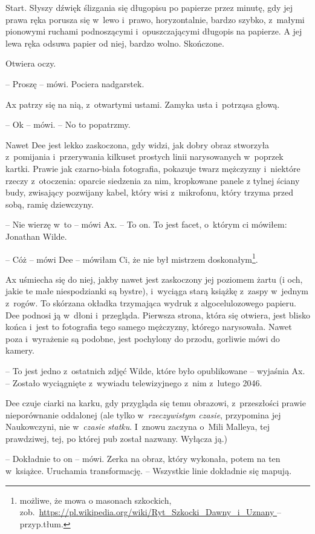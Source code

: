 \documentclass[oneside,polish,11pt,sfheadings]{mwbk}
\begin{document}
Start. Słyszy dźwięk ślizgania się długopisu po papierze przez minutę,
gdy jej prawa ręka porusza się w~lewo i~prawo, horyzontalnie, bardzo
szybko, z~małymi pionowymi ruchami podnoszącymi i~opuszczającymi
długopis na papierze. A jej lewa ręka odsuwa papier od niej, bardzo
wolno. Skończone.

Otwiera oczy. 

-- Proszę -- mówi. Pociera nadgarstek.

Ax patrzy się na nią, z~otwartymi ustami. Zamyka usta i~potrząsa głową.

-- Ok -- mówi. -- No to popatrzmy.

Nawet Dee jest lekko zaskoczona, gdy widzi, jak dobry obraz stworzyła z~pomijania i~przerywania kilkuset prostych linii narysowanych w~poprzek
kartki. Prawie jak czarno-biała fotografia, pokazuje twarz mężczyzny i~niektóre rzeczy z~otoczenia: oparcie siedzenia za nim, kropkowane panele
z tylnej ściany budy, zwisający pozwijany kabel, który wisi z~mikrofonu,
który trzyma przed sobą, ramię dziewczyny.

-- Nie wierzę w~to -- mówi Ax. -- To on. To jest facet, o~którym ci
mówiłem: Jonathan Wilde.

-- Cóż -- mówi Dee -- mówiłam Ci, że nie był mistrzem doskonałym\footnote{możliwe, że mowa o masonach szkockich,
zob.~\url{https://pl.wikipedia.org/wiki/Ryt_Szkocki_Dawny_i_Uznany
} -- przyp.tłum.}.

Ax uśmiecha się do niej, jakby nawet jest zaskoczony jej poziomem żartu
(i och, jakie te małe niespodzianki są bystre), i~wyciąga starą
książkę z~zaspy w~jednym z~rogów. To skórzana okładka trzymająca wydruk
z algocelulozowego papieru. Dee podnosi ją w~dłoni i~przegląda. Pierwsza
strona, która się otwiera, jest blisko końca i~jest to fotografia tego
samego mężczyzny, którego narysowała. Nawet poza i~wyrażenie są podobne,
jest pochylony do przodu, gorliwie mówi do kamery.

-- To jest jedno z~ostatnich zdjęć Wilde, które było opublikowane -- wyjaśnia Ax. -- Zostało wyciągnięte z~wywiadu telewizyjnego z~nim z~lutego 2046.

Dee czuje ciarki na karku, gdy przygląda się temu obrazowi, z~przeszłości prawie nieporównanie oddalonej (ale tylko w~\emph{rzeczywistym czasie}, przypomina jej Naukowczyni, nie w~\emph{czasie statku}. I~znowu zaczyna o~Mili Malleya, tej prawdziwej, tej, po której pub został nazwany. Wyłącza ją.)

-- Dokładnie to on -- mówi. Zerka na obraz, który wykonała, potem na ten w~książce. Uruchamia transformację. -- Wszystkie linie dokładnie się
mapują.
\end{document}
